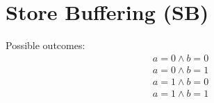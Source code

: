 \newcommand{\lbJoinTemplate}[4]{
  \codePrefix
  $\writeInstParam{\rlx}{x}{0}; \writeInstParam{\rlx}{y}{0};$ \\
\begin{tabular}{L || L || L || L}
  \readInstParam{#1}{a}{y}; & \skipc & \readInstParam{#3}{b}{x}; & \skipc \\
  \writeInstParam{\rlx}{z1}{a} & & \writeInstParam{\rlx}{z2}{b} &  \\
  \multicolumn{2}{c ||}{$\writeInstParam{#2}{x}{1}$} &
  \multicolumn{2}{c}{$\writeInstParam{#4}{y}{1}$} \\
\end{tabular}
  \codePostfix
}

\newcommand{\iriwTemplate}[8]{
  \codePrefix
  $\writeInstParam{#1}{x}{0}; \writeInstParam{#2}{y}{0};$ \\
\begin{tabular}{L || L || L || L}
  \writeInstParam{#3}{x}{1} &
  \writeInstParam{#4}{y}{1} &
  \readInstParam{#5}{a}{x}; &
  \readInstParam{#7}{c}{y}; \\
  & &
  \readInstParam{#6}{b}{y} &
  \readInstParam{#8}{d}{x} \\
\end{tabular}
  \codePostfix
}

\newcommand{\wrTemplate}[8]{
\codePrefix
  $\writeInstParam{#1}{x}{0}; \writeInstParam{#2}{y}{0};$ \\
  \begin{tabular}{L || L}
    \writeInstParam{#3}{x}{1}; &
    \writeInstParam{#5}{y}{1}; \\

    \writeInstParam{#4}{y}{2} &
    \writeInstParam{#6}{x}{2} \\
  \end{tabular} \\
  $\readInstParam{#7}{a}{x};
   \readInstParam{#8}{b}{y}$
\codePostfix
}

\section{Store Buffering (SB)}
\label{app:sb}

%
\begin{minipage}[t]{0.3\linewidth}
Possible outcomes:\\
\[\begin{array}{l}
a = 0 \land b = 0\\
a = 0 \land b = 1\\
a = 1 \land b = 0\\
a = 1 \land b = 1\\
\end{array}\]
\end{minipage}
%
\sbTemplate{\rel}{\rel}{\rel}{\acq}{\rel}{\acq}
\litmusTestEnd


